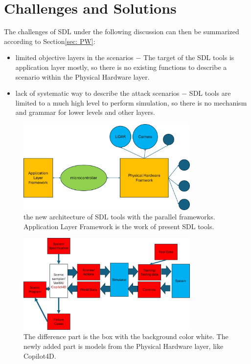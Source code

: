 \documentclass[conference]{IEEEtran}
\begin{document}
\section{Challenges and Solutions}
\label{sec: Challenges and Solutions}
The challenges of SDL under the following discussion can then be summarized according to Section\ref{sec: PW}:
\begin{itemize}
\item limited objective layers in the scenarios  $\mathrm{-}$ The target of the SDL tools is application layer mostly, so there is no existing functions to describe a scenario within the Physical Hardware layer.
\item lack of systematic way to describe the attack scenarios $\mathrm{-}$ SDL tools are limited to a much high level to perform simulation, so there is no mechanism and grammar for lower levels and other layers.
\end{itemize}
\begin{figure}[htbp]
\centerline{\includegraphics[width=90mm]{./pic/pic3_new_arc.png}}
\caption{the new architecture of SDL tools with the parallel frameworks. Application Layer Framework is the work of present SDL tools.}
\label{fig3}
\end{figure}
\begin{figure}[htbp]
\centerline{\includegraphics[width=90mm]{./pic/pic4_scenicflow.png}}
\caption{The difference part is the box with the background color white. The newly added part is models from the Physical Hardware layer, like Copilot4D.}
\label{fig4}
\end{figure}
\end{document}
